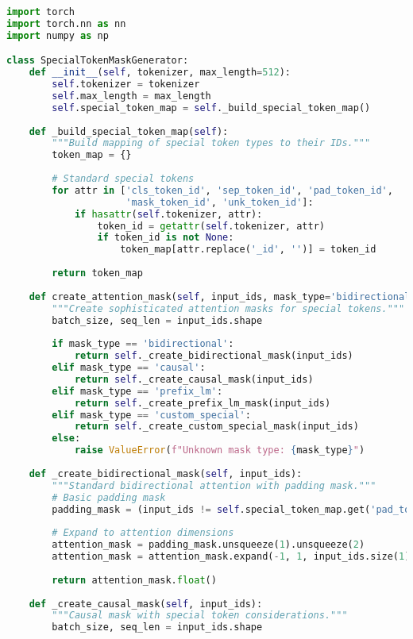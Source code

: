 \begin{lstlisting}[language=Python, caption=Comprehensive attention mask generator for special tokens]
import torch
import torch.nn as nn
import numpy as np

class SpecialTokenMaskGenerator:
    def __init__(self, tokenizer, max_length=512):
        self.tokenizer = tokenizer
        self.max_length = max_length
        self.special_token_map = self._build_special_token_map()
        
    def _build_special_token_map(self):
        """Build mapping of special token types to their IDs."""
        token_map = {}
        
        # Standard special tokens
        for attr in ['cls_token_id', 'sep_token_id', 'pad_token_id', 
                     'mask_token_id', 'unk_token_id']:
            if hasattr(self.tokenizer, attr):
                token_id = getattr(self.tokenizer, attr)
                if token_id is not None:
                    token_map[attr.replace('_id', '')] = token_id
                    
        return token_map
        
    def create_attention_mask(self, input_ids, mask_type='bidirectional'):
        """Create sophisticated attention masks for special tokens."""
        batch_size, seq_len = input_ids.shape
        
        if mask_type == 'bidirectional':
            return self._create_bidirectional_mask(input_ids)
        elif mask_type == 'causal':
            return self._create_causal_mask(input_ids)
        elif mask_type == 'prefix_lm':
            return self._create_prefix_lm_mask(input_ids)
        elif mask_type == 'custom_special':
            return self._create_custom_special_mask(input_ids)
        else:
            raise ValueError(f"Unknown mask type: {mask_type}")
            
    def _create_bidirectional_mask(self, input_ids):
        """Standard bidirectional attention with padding mask."""
        # Basic padding mask
        padding_mask = (input_ids != self.special_token_map.get('pad_token', -1))
        
        # Expand to attention dimensions
        attention_mask = padding_mask.unsqueeze(1).unsqueeze(2)
        attention_mask = attention_mask.expand(-1, 1, input_ids.size(1), -1)
        
        return attention_mask.float()
        
    def _create_causal_mask(self, input_ids):
        """Causal mask with special token considerations."""
        batch_size, seq_len = input_ids.shape
        

\end{lstlisting}

